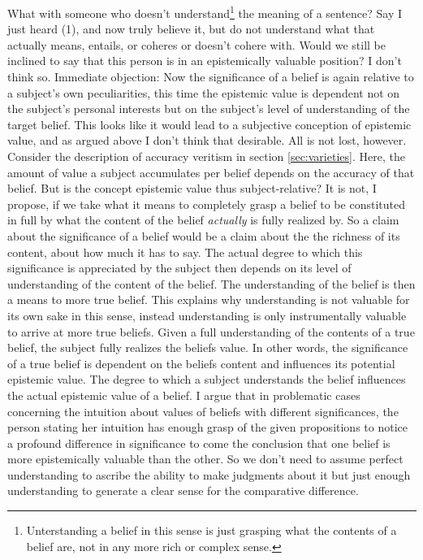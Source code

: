 \documentclass[12pt,numbers=noenddot]{scrartcl}
\begin{document}
What with someone who doesn't understand\footnote{Unterstanding a belief in this sense is just grasping what the contents of a belief are, not in any more rich or complex sense.} the meaning of a sentence? Say I just heard (1), and now truly believe it, but do not understand what that actually means, entails, or coheres or doesn't cohere with. Would we still be inclined to say that this person is in an epistemically valuable position? I don't think so. Immediate objection: Now the significance of a belief is again relative to a subject's own peculiarities, this time the epistemic value is dependent not on the subject's personal interests but on the subject's level of understanding of the target belief. This looks like it would lead to a subjective conception of epistemic value, and as argued above I don't think that desirable. All is not lost, however. Consider the description of accuracy veritism in section \ref{sec:varieties}. Here, the amount of value a subject accumulates per belief depends on the accuracy of that belief. But is the concept epistemic value thus subject-relative? It is not, I propose, if we take what it means to completely grasp a belief to be constituted in full by what the content of the belief \emph{actually} is fully realized by. So a claim about the significance of a belief would be a claim about the the richness of its content, about how much it has to say. The actual degree to which this significance is appreciated by the subject then depends on its level of understanding of the content of the belief. The understanding of the belief is then a means to more true belief. This explains why understanding is not valuable for its own sake in this sense, instead understanding is only instrumentally valuable to arrive at more true beliefs. Given a full understanding of the contents of a true belief, the subject fully realizes the beliefs value. In other words, the significance of a true belief is dependent on the beliefs content and influences its potential epistemic value. The degree to which a subject understands the belief influences the actual epistemic value of a belief. I argue that in problematic cases concerning the intuition about values of beliefs with different significances, the person stating her intuition has enough grasp of the given propositions to notice a profound difference in significance to come the conclusion that one belief is more epistemically valuable than the other. So we don't need to assume perfect understanding to ascribe the ability to make judgments about it but just enough understanding to generate a clear sense for the comparative difference.
\end{document}
